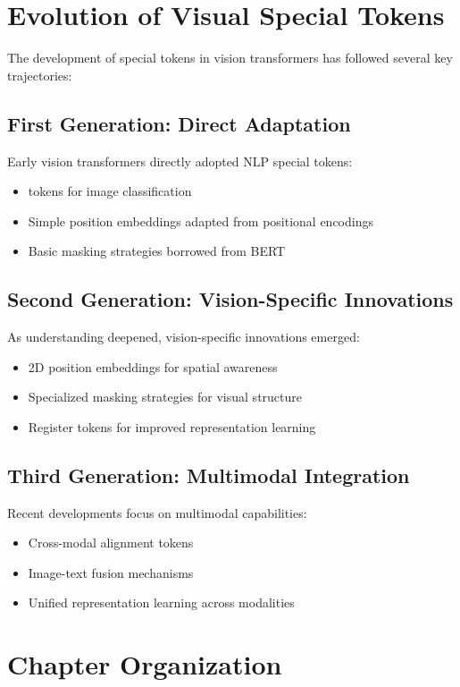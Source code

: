 \section{Evolution of Visual Special Tokens}

The development of special tokens in vision transformers has followed several key trajectories:

\subsection{First Generation: Direct Adaptation}
Early vision transformers directly adopted NLP special tokens:
\begin{itemize}
\item \cls{} tokens for image classification
\item Simple position embeddings adapted from positional encodings
\item Basic masking strategies borrowed from BERT
\end{itemize}

\subsection{Second Generation: Vision-Specific Innovations}
As understanding deepened, vision-specific innovations emerged:
\begin{itemize}
\item 2D position embeddings for spatial awareness
\item Specialized masking strategies for visual structure
\item Register tokens for improved representation learning
\end{itemize}

\subsection{Third Generation: Multimodal Integration}
Recent developments focus on multimodal capabilities:
\begin{itemize}
\item Cross-modal alignment tokens
\item Image-text fusion mechanisms
\item Unified representation learning across modalities
\end{itemize}

\section{Chapter Organization}

